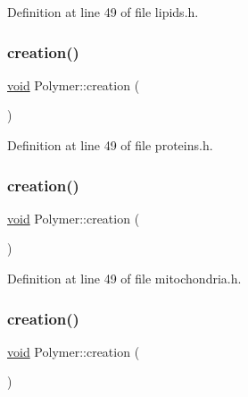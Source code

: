 Definition at line 49 of file lipids.\+h.

\mbox{\label{class_polymer_a1daba3eb2ba8428bf2f3e814668b155f}} 
\subsubsection{\texorpdfstring{creation()}{creation()}\hspace{0.1cm}{\footnotesize\ttfamily [4/10]}}
{\footnotesize\ttfamily \mbox{\hyperlink{glad_8h_a950fc91edb4504f62f1c577bf4727c29}{void}} Polymer\+::creation (\begin{DoxyParamCaption}{ }\end{DoxyParamCaption})\hspace{0.3cm}{\ttfamily [inline]}}



Definition at line 49 of file proteins.\+h.

\mbox{\label{class_polymer_a1daba3eb2ba8428bf2f3e814668b155f}} 
\subsubsection{\texorpdfstring{creation()}{creation()}\hspace{0.1cm}{\footnotesize\ttfamily [5/10]}}
{\footnotesize\ttfamily \mbox{\hyperlink{glad_8h_a950fc91edb4504f62f1c577bf4727c29}{void}} Polymer\+::creation (\begin{DoxyParamCaption}{ }\end{DoxyParamCaption})\hspace{0.3cm}{\ttfamily [inline]}}



Definition at line 49 of file mitochondria.\+h.

\mbox{\label{class_polymer_a1daba3eb2ba8428bf2f3e814668b155f}} 
\subsubsection{\texorpdfstring{creation()}{creation()}\hspace{0.1cm}{\footnotesize\ttfamily [6/10]}}
{\footnotesize\ttfamily \mbox{\hyperlink{glad_8h_a950fc91edb4504f62f1c577bf4727c29}{void}} Polymer\+::creation (\begin{DoxyParamCaption}{ }\end{DoxyParamCaption})\hspace{0.3cm}{\ttfamily [inline]}}



